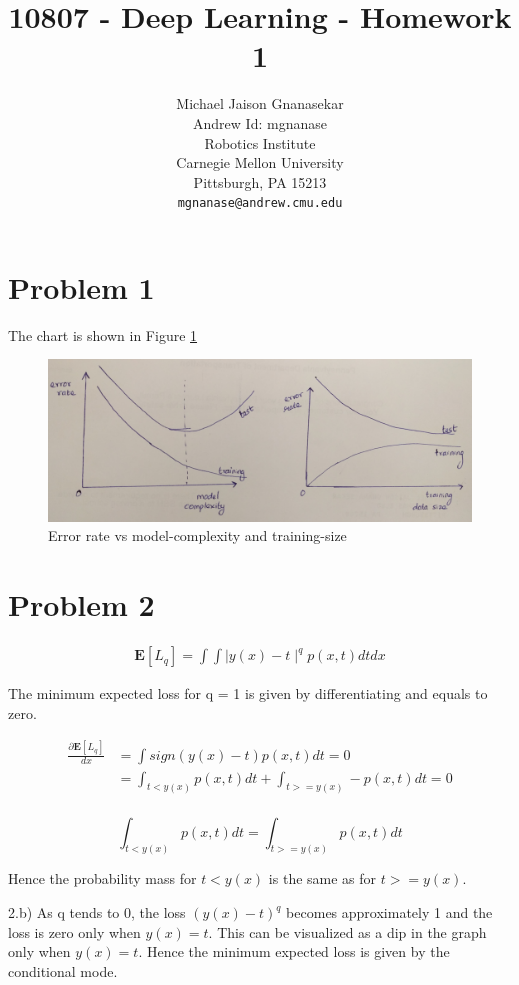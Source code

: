 \documentclass{article}
\title{10807 - Deep Learning - Homework 1}
\author{
  Michael Jaison Gnanasekar\\
  Andrew Id: mgnanase\\
  Robotics Institute\\
  Carnegie Mellon University\\
  Pittsburgh, PA 15213 \\
  \texttt{mgnanase@andrew.cmu.edu} \\
}
\begin{document}

\maketitle

\section{Problem 1}

The chart is shown in Figure \ref{fig:1}

\begin{figure}[!h]
  \centering
  \includegraphics[width=\textwidth]{figures/1}
  \caption{Error rate vs model-complexity and training-size}
  \label{fig:1}
\end{figure}


\section{Problem 2}

\begin{align*}
\mathbf{E}[L_q] = \int \int \mid y(x) - t \mid ^ q p(x, t) dt dx
\end{align*}

The minimum expected loss for q = 1 is given by differentiating and equals to zero.

\begin{align*}
\frac{\partial \mathbf{E}[L_q] }{dx} &= \int sign(y(x) - t)  p(x, t) dt = 0 \\
&= \int_{t < y(x)}  p(x, t) dt + \int_{t >= y(x)} -  p(x, t) dt = 0 \\
\end{align*}

\[
\int_{t < y(x)}  p(x, t) dt = \int_{t >= y(x)} p(x, t) dt
\]

Hence the probability mass for $t < y(x)$ is the same as for $t >= y(x)$.

2.b) As q tends to 0, the loss $(y(x) - t)^q$ becomes approximately 1 and the loss is zero only when $y(x) = t$. This can be visualized as a dip in the graph only when $y(x) = t$. Hence the minimum expected loss is given by the conditional mode.
\end{document}
